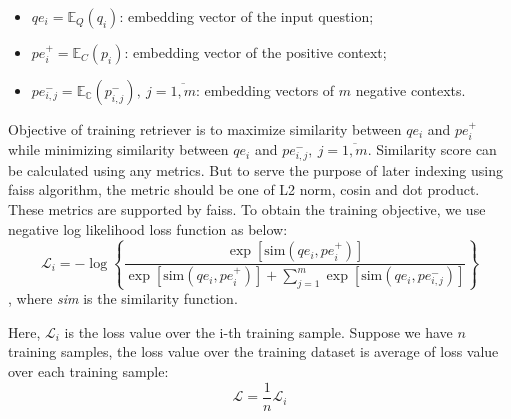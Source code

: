 \documentclass[12pt, sort&compress]{report}
\begin{document}
\begin{itemize}[itemsep=5pt]
	\item $qe_i = \mathbb{E}_Q(q_i)$: embedding vector of the input question;
	\item $pe_i^+ = \mathbb{E}_C(p_i)$: embedding vector of the positive context;
	\item $pe_{i,j}^- = \mathbb{E_C}(p_{i,j}^-), \: j = \overline{1, m}$: embedding vectors of $m$ negative contexts.
\end{itemize}
\par Objective of training retriever is to maximize similarity between $qe_i$ and $pe^+_i$ while minimizing similarity between $qe_i$ and $pe_{i,j}^-, \: j=\overline{1, m}$. Similarity score can be calculated using any metrics. But to serve the purpose of later indexing using faiss algorithm, the metric should be one of L2 norm, cosin and dot product. These metrics are supported by faiss. To obtain the training objective, we use negative log likelihood loss function as below:
\begin{equation}
	\label{eq:01}
	\mathcal{L}_i = -\log\left\{\dfrac{\exp\left[{\text{sim}\left(qe_i, pe_i^+\right)}\right]}{\exp\left[{\text{sim}\left(qe_i, pe_i^+\right)}\right] + \sum\limits_{j=1}^m\exp\left[\text{sim}\left(qe_i, pe_{i,j}^-\right)\right]}\right\}
\end{equation},
where \textit{sim} is the similarity function.
\par Here, $\mathcal{L}_i$ is the loss value over the i-th training sample. Suppose we have $n$ training samples, the loss value over the training dataset is average of loss value over each training sample:
\begin{equation}
	\mathcal{L} = \dfrac{1}{n}\mathcal{L}_i
\end{equation}
\end{document}
